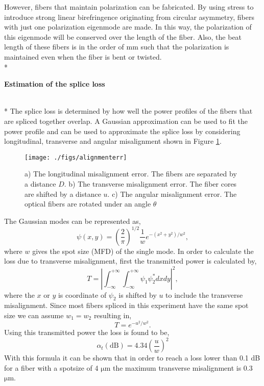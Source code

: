 However, fibers that maintain polarization can be fabricated. By using stress to  introduce strong linear birefringence originating from circular asymmetry, fibers with just one polarization eigenmode are made. In this way, the polarization of this eigenmode will be conserved over the length of the fiber.  Also, the beat length of these fibers is in the order of mm such that the polarization is maintained even when the fiber is bent or twisted. \newline
\\*
{\raggedright\color{color1}\textbf{Estimation of the splice loss}}
\\*
\newline
The splice loss is determined by how well the power profiles of the fibers that are spliced together overlap. A Gaussian approximation can be used to fit the power profile and can be used to approximate the splice loss by considering longitudinal, transverse and angular misalignment shown in Figure \ref{fig:aerror}.

\begin{figure}[h!]\centering
\texttt{[image: ./figs/alignmenterr]}
\caption{a) The longitudinal misalignment error. The fibers are separated by a distance $D$. b) The transverse misalignment error. The fiber cores are shifted by a distance $u$. c) The angular misalignment error. The optical fibers are rotated under an angle $\theta$}
\label{fig:aerror}
\end{figure}


The Gaussian modes can be represented as, 
\begin{equation}
\psi(x,y) = \left(\frac{2}{\pi}\right)^{1/2} \frac{1}{w}e^{-\left(x^2 + y^2\right)/w^2},
\end{equation}
where $w$ gives the spot size (MFD) of the single mode. In order to calculate the loss due to transverse misalignment, first the transmitted power is calculated by,
\begin{equation}
T = \left| \int_{- \infty}^{+\infty}\int_{- \infty}^{+\infty} \psi_1 \psi_2^* dxdy \right|^2,
\end{equation}
where the $x$ or $y$ is coordinate of $\psi_2$ is shifted by $u$ to include the transverse misalignment. Since most fibers spliced in this experiment have the same spot size we can assume $w_1 =w_2$ resulting in, 
\begin{equation}
T = e^{-u^2/w^2}.
\end{equation}
 Using this transmitted power the loss is found to be, 
\begin{equation}
\alpha_t(\mathrm{dB}) = 4.34 \left( \frac{u}{w} \right)^2
\end{equation}
With this formula it can be shown that in order to reach a loss lower than 0.1 dB for a fiber with a spotsize of 4 $\mathrm{\mu m}$ the maximum transverse misalignment is 0.3 $\mathrm{\mu m}$.


